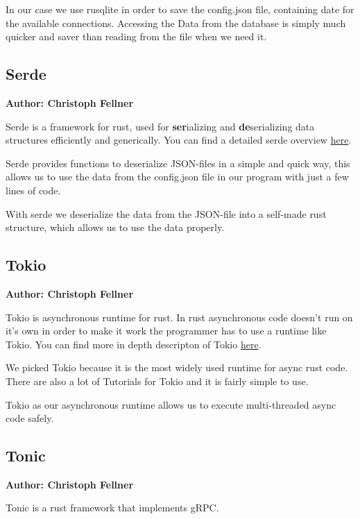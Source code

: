 In our case we use rusqlite in order to save the config.json file, containing date for the available connections. Accessing the Data from the database is simply much quicker and saver than reading from the file when we need it. 

\subsection{Serde}
\textbf{Author: Christoph Fellner}

Serde is a framework for rust, used for \textbf{ser}ializing and \textbf{de}serializing data structures efficiently and generically. You can find a detailed serde overview \href{https://serde.rs/}{here}.

Serde provides functions to deserialize JSON-files in a simple and quick way, this allows us to use the data from the config.json file in our program with just a few lines of code.

With serde we deserialize the data from the JSON-file into a self-made rust structure, which allows us to use the data properly.  

\subsection{Tokio}
\textbf{Author: Christoph Fellner}

Tokio is asynchronous runtime for rust. In rust asynchronous code doesn't run on it's own in order to make it work the programmer has to use a runtime like Tokio. You can find more in depth descripton of Tokio \href{https://tokio.rs/tokio/tutorial}{here}. 

We picked Tokio because it is the most widely used runtime for async rust code. There are also a lot of Tutorials for Tokio and it is fairly simple to use.

Tokio as our asynchronous runtime allows us to execute multi-threaded async code safely.  

\subsection{Tonic}
\textbf{Author: Christoph Fellner}

Tonic is a rust framework that implements gRPC.

\filbreak
